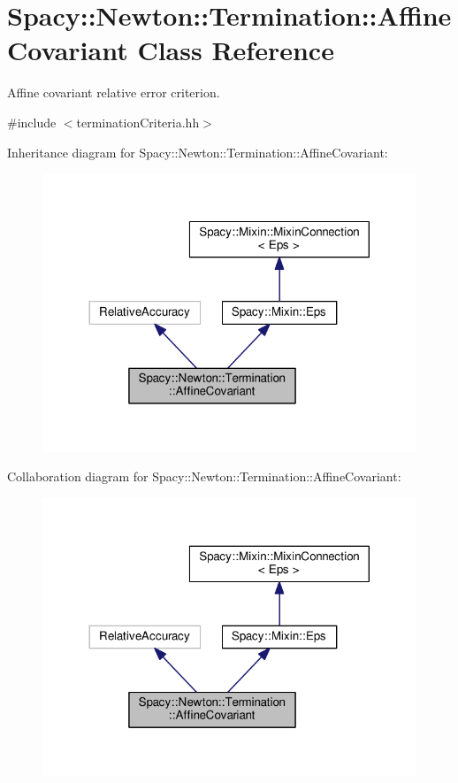 \hypertarget{classSpacy_1_1Newton_1_1Termination_1_1AffineCovariant}{\section{Spacy\-:\-:Newton\-:\-:Termination\-:\-:Affine\-Covariant Class Reference}
\label{classSpacy_1_1Newton_1_1Termination_1_1AffineCovariant}
}


Affine covariant relative error criterion.  




{\ttfamily \#include $<$termination\-Criteria.\-hh$>$}



Inheritance diagram for Spacy\-:\-:Newton\-:\-:Termination\-:\-:Affine\-Covariant\-:
\nopagebreak
\begin{figure}[H]
\begin{center}
\leavevmode
\includegraphics[width=317pt]{classSpacy_1_1Newton_1_1Termination_1_1AffineCovariant__inherit__graph}
\end{center}
\end{figure}


Collaboration diagram for Spacy\-:\-:Newton\-:\-:Termination\-:\-:Affine\-Covariant\-:
\nopagebreak
\begin{figure}[H]
\begin{center}
\leavevmode
\includegraphics[width=317pt]{classSpacy_1_1Newton_1_1Termination_1_1AffineCovariant__coll__graph}
\end{center}
\end{figure}
